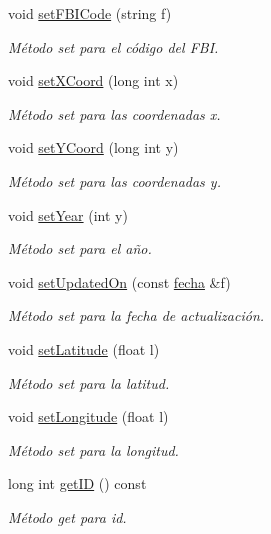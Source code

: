 \begin{DoxyCompactItemize}
void \hyperlink{classcrimen_a9326d4de8f302571f5de1f996ba48119}{set\-F\-B\-I\-Code} (string f)
\begin{DoxyCompactList}\small\item\em Método set para el código del F\-B\-I. \end{DoxyCompactList}\item 
void \hyperlink{classcrimen_a4bc08a0cf5396b450b4cbee72385c7a4}{set\-X\-Coord} (long int x)
\begin{DoxyCompactList}\small\item\em Método set para las coordenadas x. \end{DoxyCompactList}\item 
void \hyperlink{classcrimen_add289c91524b2677c2edac9ea9888c4a}{set\-Y\-Coord} (long int y)
\begin{DoxyCompactList}\small\item\em Método set para las coordenadas y. \end{DoxyCompactList}\item 
void \hyperlink{classcrimen_a24a55dde1a2d92aba25f507801350814}{set\-Year} (int y)
\begin{DoxyCompactList}\small\item\em Método set para el año. \end{DoxyCompactList}\item 
void \hyperlink{classcrimen_ac24c7e6ff6f86c91a5f326409058a57c}{set\-Updated\-On} (const \hyperlink{classfecha}{fecha} \&f)
\begin{DoxyCompactList}\small\item\em Método set para la fecha de actualización. \end{DoxyCompactList}\item 
void \hyperlink{classcrimen_a8a240b81e64dec43b0f8dab86a173141}{set\-Latitude} (float l)
\begin{DoxyCompactList}\small\item\em Método set para la latitud. \end{DoxyCompactList}\item 
void \hyperlink{classcrimen_ada3370502829f83559b4a5acf20369b5}{set\-Longitude} (float l)
\begin{DoxyCompactList}\small\item\em Método set para la longitud. \end{DoxyCompactList}\item 
long int \hyperlink{classcrimen_a855eab30a304a6498828cb5d85a4e0e3}{get\-I\-D} () const 
\begin{DoxyCompactList}\small\item\em Método get para id. \end{DoxyCompactList}\item 

\end{DoxyCompactItemize}

